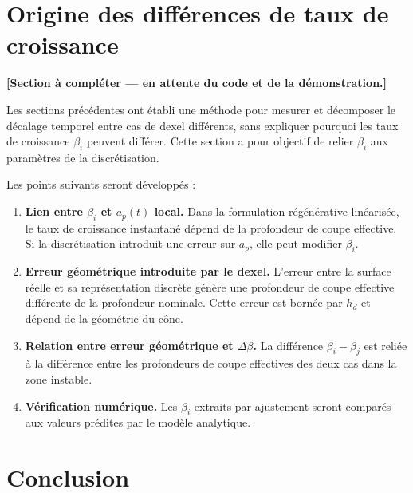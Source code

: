 \documentclass[11pt,a4paper]{article}
\newcommand{\ap}{a_p}                          %
\newcommand{\dxl}{h_{d}}                       %
\newcommand{\betai}{\beta_i}                   %
\begin{document}
\section{Origine des différences de taux de croissance}
\label{sec:beta-origin}

\textbf{[Section à compléter — en attente du code et de la démonstration.]}

Les sections précédentes ont établi une méthode pour mesurer et décomposer le
décalage temporel entre cas de dexel différents, sans expliquer pourquoi les
taux de croissance \(\betai\) peuvent différer. Cette section a pour objectif de
relier \(\betai\) aux paramètres de la discrétisation.

Les points suivants seront développés :

\begin{enumerate}
    \item \textbf{Lien entre \(\betai\) et \(\ap(t)\) local.} Dans la
    formulation régénérative linéarisée, le taux de croissance instantané
    dépend de la profondeur de coupe effective. Si la discrétisation introduit
    une erreur sur \(\ap\), elle peut modifier \(\betai\).

    \item \textbf{Erreur géométrique introduite par le dexel.} L'erreur entre
    la surface réelle et sa représentation discrète génère une profondeur de
    coupe effective différente de la profondeur nominale. Cette erreur est bornée
    par \(\dxl\) et dépend de la géométrie du cône.

    \item \textbf{Relation entre erreur géométrique et \(\Delta\beta\).}
    La différence \(\beta_i - \beta_j\) est reliée à la différence entre les
    profondeurs de coupe effectives des deux cas dans la zone instable.

    \item \textbf{Vérification numérique.} Les \(\betai\) extraits par
    ajustement seront comparés aux valeurs prédites par le modèle analytique.
\end{enumerate}


\section{Conclusion}
\label{sec:conclusion}
\end{document}
